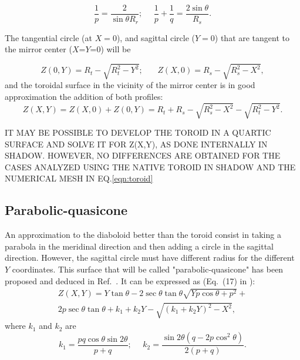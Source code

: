 \documentclass{iucr}              %
\newcommand{\inred}[1]{{\color{red}#1}}
\begin{document}
\begin{equation}
\label{eqn:radii}
\frac{1}{p} = \frac{2 }{\sin\theta R_r};~~~~~~
\frac{1}{p} + \frac{1}{q} = \frac{2\sin\theta}{ R_s}.
\end{equation}

The tangential circle (at $X=0$), and sagittal circle ($Y=0$) that are tangent to the mirror center ($X$=$Y$=0) will be

\begin{equation}
\label{eqn:toroidTS}
Z(0,Y) = R_t - \sqrt{R_t^2 - Y^2};~~~~~~~~
Z(X,0) = R_s - \sqrt{R_s^2 - X^2},
\end{equation}
and the toroidal surface \inred{in the vicinity of the mirror center is in good approximation} the addition of both profiles: 
\begin{equation}
\label{eqn:toroid}
Z(X,Y) = Z(X,0) + Z(0,Y) = 
R_t + R_s - \sqrt{R_s^2 - X^2}
- \sqrt{R_t^2 - Y^2}.
\end{equation}

\inred{IT MAY BE POSSIBLE TO DEVELOP THE TOROID IN A QUARTIC SURFACE AND SOLVE IT FOR Z(X,Y), AS DONE INTERNALLY IN SHADOW. HOWEVER, NO DIFFERENCES ARE OBTAINED FOR THE CASES ANALYZED USING THE NATIVE TOROID IN SHADOW AND THE NUMERICAL MESH IN EQ.\ref{eqn:toroid}}

\subsection{Parabolic-\inred{quasi}cone}\label{sec:quasicone}
An approximation to the diaboloid better than the toroid consist in taking a parabola in the meridinal direction and then adding a circle in the sagittal direction. However, the sagittal circle must have different radius for the different $Y$ coordinates. This surface that will be called "parabolic-\inred{quasi}cone" has been proposed and deduced in Ref.~\cite{Valeriy2020c}. It can be expressed as (Eq.~(17) in \cite{Valeriy2020c}):
\begin{multline}
\label{eqn:parabolicCone}
Z(X,Y) = Y \tan\theta - 2 \sec\theta \tan\theta
\sqrt{Y p \cos\theta + p^2} + \\
2 p \sec\theta \tan\theta +
k_1 + k_2 Y - \sqrt{(k_1 + k_2 Y)^2 - X^2},
\end{multline}
where $k_1$ and $k_2$ are
\begin{equation}
k_1 = \frac{p q \cos\theta \sin2\theta}{p+q};~~~~~~
k_2 = \frac{\sin2\theta(q-2p\cos^2\theta)}{2(p+q)}.
\end{equation}
\end{document}

